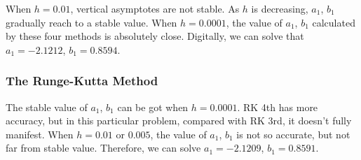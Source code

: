 \documentclass[a4paper]{article}
\begin{document}
	When $h=0.01$, vertical asymptotes are not stable. As $h$ is decreasing, $a_1$, $b_1$ gradually reach to a stable value. When $h=0.0001$, the value of $a_1$, $b_1$ calculated by these four methods is absolutely close. Digitally, we can solve that $a_1=-2.1212$, $b_1=0.8594$.
	
	
	\subsubsection{The Runge-Kutta Method}
	
	The stable value of $a_1$, $b_1$ can be got when $h=0.0001$. RK 4th has more accuracy, but in this particular problem, compared with RK 3rd, it doesn’t fully manifest. When $h=0.01$ or $0.005$, the value of $a_1$, $b_1$ is not so accurate, but not far from stable value. Therefore, we can solve $a_1=-2.1209$, $b_1= 0.8591$.
	
	\begin{table}[H]
		\centering
		\caption{Using Runge-Kutta Method to Determine t When y is infinity}
		\label{tab:rk_inf}
	\end{table}
	
	
\end{document}
